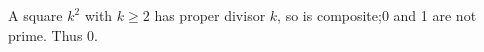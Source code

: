 A square $k^2$ with $k\ge2$ has proper divisor $k$, so is composite;0 and 1 are not prime. Thus $\boxed0$.
